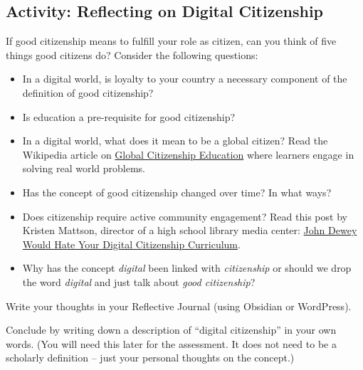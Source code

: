 \documentclass[
]{book}
\providecommand{\tightlist}{%
  \setlength{\itemsep}{0pt}\setlength{\parskip}{0pt}}
\theoremstyle{definition}
\theoremstyle{definition}
\theoremstyle{definition}
\theoremstyle{definition}
\theoremstyle{remark}
\begin{document}
\hypertarget{activity-reflecting-on-digital-citizenship}{%
\subsection*{Activity: Reflecting on Digital Citizenship}\label{activity-reflecting-on-digital-citizenship}}

\begin{reflect}
If good citizenship means to fulfill your role as citizen, can you think of five things good citizens do? Consider the following questions:

\begin{itemize}
\tightlist
\item
  In a digital world, is loyalty to your country a necessary component of the definition of good citizenship?\\
\item
  Is education a pre-requisite for good citizenship?\\
\item
  In a digital world, what does it mean to be a global citizen? Read the Wikipedia article on \href{https://en.wikipedia.org/wiki/Global_citizenship_education}{Global Citizenship Education} where learners engage in solving real world problems.\\
\item
  Has the concept of good citizenship changed over time? In what ways?\\
\item
  Does citizenship require active community engagement? Read this post by Kristen Mattson, director of a high school library media center: \href{https://drkmattson.wordpress.com/2016/08/03/john-dewey-would-hate-your-digital-citizenship-curriculum/}{John Dewey Would Hate Your Digital Citizenship Curriculum}.\\
\item
  Why has the concept \emph{digital} been linked with \emph{citizenship} or should we drop the word \emph{digital} and just talk about \emph{good citizenship}?
\end{itemize}

Write your thoughts in your Reflective Journal (using Obsidian or WordPress).

Conclude by writing down a description of ``digital citizenship'' in your own words. (You will need this later for the assessment. It does not need to be a scholarly definition -- just your personal thoughts on the concept.)
\end{reflect}
\end{document}
